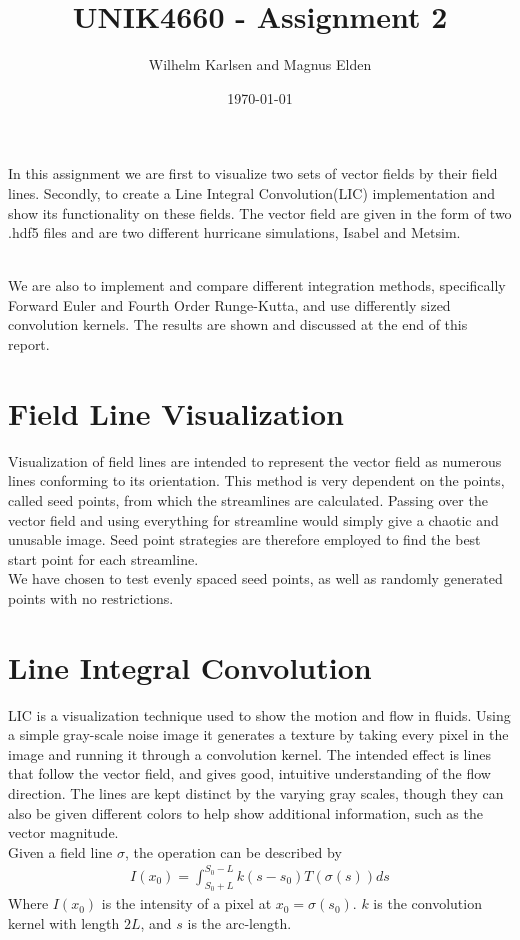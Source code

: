 \documentclass[11pt,a4paper,english]{article}
\title{UNIK4660 - Assignment 2}
\author{Wilhelm Karlsen and Magnus Elden}
\date{\today}
\numberwithin{equation}{section}
\begin{document}
\maketitle
In this assignment we are first to visualize two sets of vector fields by their field lines. Secondly, to create a Line Integral Convolution(LIC) implementation and show its functionality on these fields. The vector field are given in the form of two .hdf5 files and are two different hurricane simulations, Isabel and Metsim.

\\
We are also to implement and compare different integration methods, specifically Forward Euler and Fourth Order Runge-Kutta, and use differently sized convolution kernels. The results are shown and discussed at the end of this report.

\section{Field Line Visualization}
Visualization of field lines are intended to represent the vector field as numerous lines conforming to its orientation. This method is very dependent on the points, called seed points, from which the streamlines are calculated. Passing over the vector field and using everything for streamline would simply give a chaotic and unusable image. Seed point strategies are therefore employed to find the best start point for each streamline. 
\\
We have chosen to test evenly spaced seed points, as well as randomly generated points with no restrictions.

\section{Line Integral Convolution}
LIC is a visualization technique used to show the motion and flow in fluids. Using a simple gray-scale noise image it generates a texture by taking every pixel in the image and running it through a convolution kernel. The intended effect is lines that follow the vector field, and gives good, intuitive understanding of the flow direction. The lines are kept distinct by the varying gray scales, though they can also be given different colors to help show additional information, such as the vector magnitude.
\\
Given a field line $\sigma$, the operation can be described by
\begin{align*}
	I(x_0) = \int_{S_0+L}^{S_0-L}k(s - s_0)T(\sigma(s))ds
\end{align*}
Where $I(x_0)$ is the intensity of a pixel at $x_0 = \sigma(s_0)$. $k$ is the convolution kernel with length $2L$, and $s$ is the arc-length.
\end{document}
